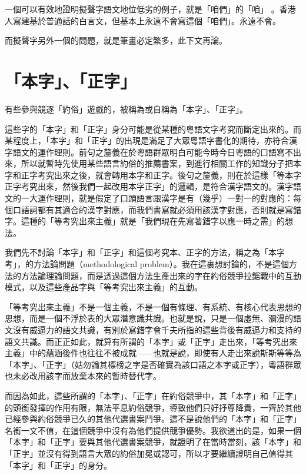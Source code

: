\documentclass[a5paper, 10pt, openany]{book} %
\begin{document}
一個可以有效地證明擬聲字語文地位低劣的例子，就是「咱們」的「咱」 。香港人寫建基於普通話的白言文，但基本上永遠不會寫這個「咱們」。永遠不會。

而擬聲字另外一個的問題，就是筆畫必定繁多，此下文再論。

\section{「本字」、「正字」}

有些參與競逐「約俗」遊戲的，被稱為或自稱為「本字」、「正字」。

這些字的「本字」和「正字」身分可能是從某種的粵語文字考究而斷定出來的。而某程度上，「本字」和「正字」的出現是滿足了大眾粵語字書化的期待，亦符合漢字語文的運作理則。前句之釐義在於粵語群眾明白可能今時今日粵語的口語寫不出來，所以就暫時先使用某些語言約俗的推薦書案，到進行相關工作的知識分子把本字和正字考究出來之後，就會轉用本字和正字。後句之釐義，則在於這樣「等本字正字考究出來，然後我們一起改用本字正字」的邏輯，是符合漢字語文的。漢字語文的一大運作理則，就是假定了口頭語言跟漢字是有（幾乎）一對一的對應的：每個口語詞都有其適合的漢字對應，而我們書寫就必須用該漢字對應，否則就是寫錯字。這種的「等考究出來主義」就是「我們現在先寫著錯字以應一時之需」的想法。

我們先不討論「本字」和「正字」和這個考究本、正字的方法，稱之為「本字考」，的方法論問題（methodological problem）。我在這裏想討論的，不是這個方法的方法論理論問題，而是透過這個方法生產出來的字在約俗競爭拉鋸戰中的互動模式，以及這些產品字與「等考究出來主義」的互動。

「等考究出來主義」不是一個主義，不是一個有條理、有系統、有核心代表思想的思想，而是一個不浮於表的大眾潛意識共識。也就是說，只是一個虛無、瀰漫的語文沒有威逼力的語文共識，有別於寫錯字會千夫所指的這些背後有威逼力和支持的語文共識。而正正如此，就算有所謂的「本字」或「正字」走出來，「等考究出來主義」中的蘊涵後件也往往不被成就——也就是說，即使有人走出來說斯斯等等為「本字」、「正字」（姑勿論其標榜之字是否確實為該口語之本字或正字），粵語群眾也未必改用該字而放棄本來的暫時替代字。

而因為如此，這些所謂的「本字」、「正字」在約俗競爭中，其「本字」和「正字」的頭銜發揮的作用有限，無法平息約俗競爭，導致他們只好抒尊降貴，一齊於其他已經參與約俗競爭已久的其他代選書案鬥爭。這不是說他們的「本字」和「正字」名銜一文不值，在這個競爭中沒有為他們提供競爭優勢。我欲道出的是，如果一個「本字」和「正字」要與其他代選書案競爭，就證明了在當時當刻，該「本字」和「正字」並沒有得到語言大眾的約俗加冕或認可，所以才要繼續證明自己值得其「本字」和「正字」的身分。
\end{document}
